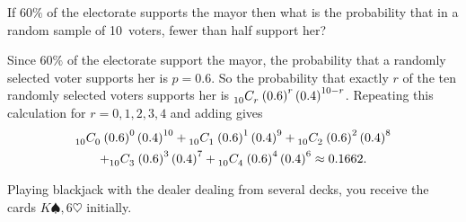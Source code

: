 \documentclass[answers,12pt]{exam}
\newcommand\ncr[2]{\tensor[_{#1}]C{_{#2}}}
\begin{document}
\begin{questions}
\question If $60\%$ of the electorate supports the mayor
then what is the probability that in a random sample
of 10~voters, fewer than half support her?
\begin{solution} Since $60\%$ of the electorate support the mayor,
the probability that a randomly selected voter supports her
is $p=0.6$. So the probability that exactly $r$ of the ten randomly
selected voters
supports her is $\ncr{10}{r}\left(0.6\right)^r\left(0.4\right)^{10-r}$.
Repeating this calculation for $r=0,1,2,3,4$ and adding gives
\begin{multline*}
\ncr{10}{0}\left(0.6\right)^0\left(0.4\right)^{10}
+\ncr{10}{1}\left(0.6\right)^1\left(0.4\right)^9
+\ncr{10}{2}\left(0.6\right)^2\left(0.4\right)^8\\
+\ncr{10}{3}\left(0.6\right)^3\left(0.4\right)^7
+\ncr{10}{4}\left(0.6\right)^4\left(0.4\right)^6
\approx 0.1662.
\end{multline*}
\end{solution}

\question Playing blackjack with the dealer dealing
from several decks, you receive the cards $K\spadesuit,6\heartsuit$
initially.
\end{questions}
\end{document}
